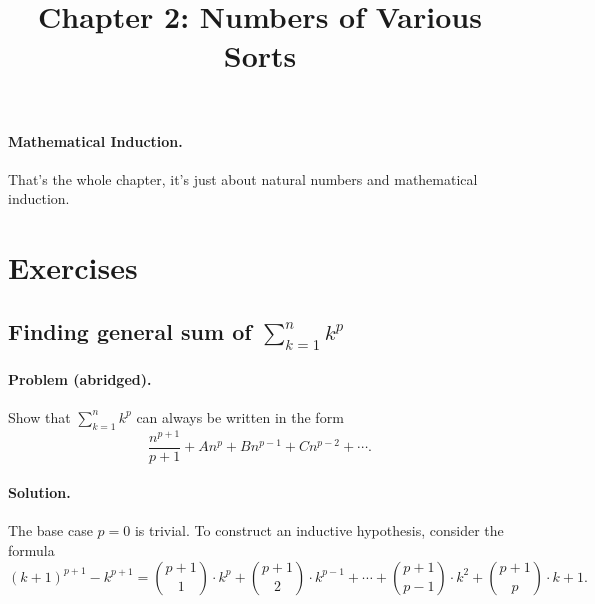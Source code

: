 \documentclass{article}
\begin{document}
\title{Chapter 2: Numbers of Various Sorts}
\maketitle

\paragraph{Mathematical Induction.} That's the whole chapter, it's just about natural numbers and mathematical induction.

\section{Exercises}

\setcounter{subsection}{6}
\subsection{Finding general sum of $\sum^n_{k=1} k^p$}

\paragraph{Problem (abridged).} Show that $\sum^n_{k=1} k^p$ can always be written in the form \begin{equation*}
  \frac{n^{p+1}}{p + 1} + An^p + Bn^{p-1} + Cn^{p-2} + \cdots.
\end{equation*}

\paragraph{Solution.} The base case $p = 0$ is trivial. To construct an inductive hypothesis, consider the formula \begin{equation*}
  (k + 1)^{p+1} - k^{p+1} = \binom{p+1}{1} \cdot k^p + \binom{p+1}{2} \cdot k^{p-1} + \cdots + \binom{p+1}{p-1} \cdot k^2 + \binom{p+1}{p} \cdot k + 1.
\end{equation*}
\end{document}
